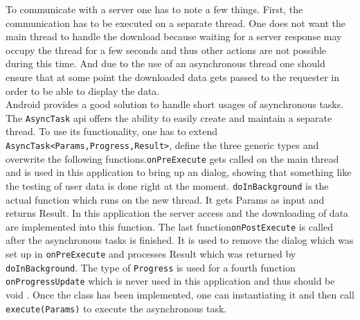 To  communicate with a server one has to note a few things. First, the communication has to be executed on a separate thread. One does not want the main thread to handle the download because waiting for a server response may occupy the thread for a few seconds and thus other actions are not possible during this time. And due to the use of an asynchronous thread one should ensure that at some point the downloaded data gets passed to the requester in order to be able to display the data.\\
Android provides a good solution to handle short usages of asynchronous tasks. The \lstinline$AsyncTask$ api offers the ability to easily create and maintain a separate thread. To use its functionality, one has to extend \lstinline$AsyncTask<Params,Progress,Result>$, define the three generic types and overwrite the following functions.\lstinline$onPreExecute$ gets called on the main thread and is used in this application to bring up an dialog, showing that something like the testing of user data is done right at the moment.  \lstinline$doInBackground$ is the actual function which runs on the new thread. It gets Params as input and returns Result. In this application the server access and the downloading of data are implemented into this function. The last function\lstinline$onPostExecute$ is called after the asynchronous tasks is finished. It is used to remove the dialog which was set up in \lstinline$onPreExecute$ and processes Result which was returned by \lstinline$doInBackground$. The type of \lstinline$Progress$ is used for a fourth function \lstinline$onProgressUpdate$ which is never used in this application and thus should be void \cite{asynctask}. Once the class has been implemented, one can instantiating it and then call \lstinline$execute(Params)$ to execute the asynchronous task.

